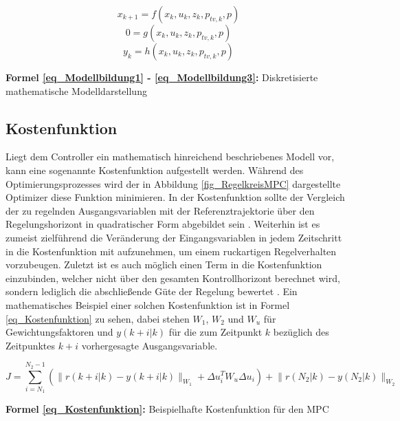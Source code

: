 \begin{equation} \label{eq_Modellbildung1}
    x_{k+1} = f(x_k, u_k, z_k, p_{tv,k}, p)
\end{equation}
\vspace*{-2.5\baselineskip}
\begin{equation} \label{eq_Modellbildung2}
    0 = g(x_k, u_k, z_k, p_{tv,k}, p)
\end{equation}
\vspace*{-2.5\baselineskip}
\begin{equation} \label{eq_Modellbildung3}
    y_k = h(x_k, u_k, z_k, p_{tv,k}, p)
\end{equation}
\centerline{\small{\textsf{\textbf{Formel \ref{eq_Modellbildung1} - \ref{eq_Modellbildung3}:}} Diskretisierte mathematische Modelldarstellung}}


\subsection{Kostenfunktion} \label{subsec_Modellbildung}
Liegt dem Controller ein mathematisch hinreichend beschriebenes Modell vor, kann eine sogenannte Kostenfunktion aufgestellt werden.
Während des Optimierungsprozesses wird der in Abbildung \ref{fig_RegelkreisMPC} dargestellte Optimizer diese Funktion minimieren.
In der Kostenfunktion sollte der Vergleich der zu regelnden Ausgangsvariablen mit der Referenztrajektorie über den Regelungshorizont in quadratischer Form abgebildet sein \cite[S.24]{Diehl}\cite[S.3]{Schwenzer}.
Weiterhin ist es zumeist zielführend die Veränderung der Eingangsvariablen in jedem Zeitschritt in die Kostenfunktion mit aufzunehmen, um einem ruckartigen Regelverhalten vorzubeugen.
Zuletzt ist es auch möglich einen Term in die Kostenfunktion einzubinden, welcher nicht über den gesamten Kontrollhorizont berechnet wird, sondern lediglich die abschließende Güte der Regelung bewertet \cite[S.24]{Diehl}.
Ein mathematisches Beispiel einer solchen Kostenfunktion ist in Formel \ref{eq_Kostenfunktion} zu sehen, dabei stehen $W_1$, $W_2$ und $W_u$ für Gewichtungsfaktoren und $y(k+i\rvert k)$ für die zum Zeitpunkt $k$ bezüglich des Zeitpunktes $k+i$ vorhergesagte Ausgangsvariable. \cite[S.3]{Schwenzer}

\begin{equation} \label{eq_Kostenfunktion}
    J = \sum_{i=N_1}^{N_2-1}\left(\lVert r(k+i\rvert k)-y(k+i\rvert k)\rVert_{W_1} + \Delta u_i^T W_u \Delta u_i\right) + \lVert r(N_2\rvert k)-y(N_2\rvert k)\rVert_{W_2}
\end{equation}
\centerline{\small{\textsf{\textbf{Formel \ref{eq_Kostenfunktion}:}} Beispielhafte Kostenfunktion für den MPC}}



